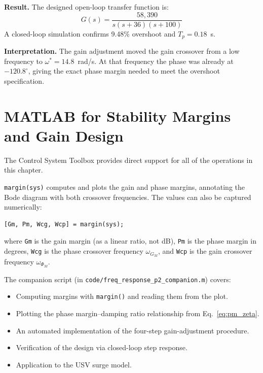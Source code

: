 \documentclass[../../book.tex]{subfiles}
\begin{document}
\textbf{Result.}  The designed open-loop transfer function is:
\begin{equation}
  G(s) = \frac{58{,}390}{s(s+36)(s+100)}
  \label{eq:ex2_result}
\end{equation}
A closed-loop simulation confirms 9.48\% overshoot and $T_p = 0.18$~s.

\medskip
\noindent\textbf{Interpretation.}  The gain adjustment moved the gain crossover
from a low frequency to $\omega^* = 14.8$~rad/s.  At that frequency the phase
was already at $-120.8^\circ$, giving the exact phase margin needed to meet
the overshoot specification.

\section{MATLAB for Stability Margins and Gain Design}
\label{sec:matlab}

The Control System Toolbox provides direct support for all of the operations in
this chapter.

\texttt{margin(sys)} computes and plots the gain and phase margins, annotating
the Bode diagram with both crossover frequencies.  The values can also be
captured numerically:
\begin{verbatim}
[Gm, Pm, Wcg, Wcp] = margin(sys);
\end{verbatim}
where \texttt{Gm} is the gain margin (as a linear ratio, not dB), \texttt{Pm}
is the phase margin in degrees, \texttt{Wcg} is the phase crossover frequency
$\omega_{G_M}$, and \texttt{Wcp} is the gain crossover frequency
$\omega_{\Phi_M}$.

The companion script (in \texttt{code/freq\_response\_p2\_companion.m}) covers:
\begin{itemize}
  \item Computing margins with \texttt{margin()} and reading them from the plot.
  \item Plotting the phase margin--damping ratio relationship from
    Eq.~\eqref{eq:pm_zeta}.
  \item An automated implementation of the four-step gain-adjustment procedure.
  \item Verification of the design via closed-loop step response.
  \item Application to the USV surge model.
\end{itemize}
\end{document}
